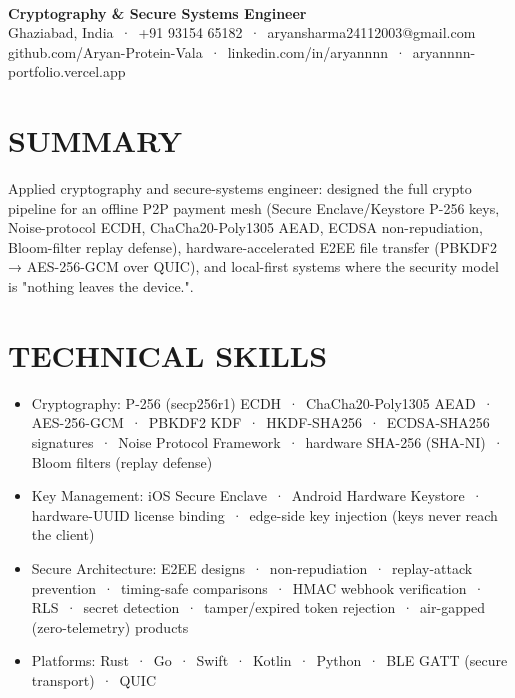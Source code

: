 \documentclass[9pt]{article}
\begin{document}
\\[3pt]
{\large\bfseries Cryptography \& Secure Systems Engineer}\\[3pt]
{\small\color{greyc} Ghaziabad, India \,·\, +91 93154 65182 \,·\, aryansharma24112003@gmail.com}\vspace{-2pt}
{\small\color{greyc} github.com/Aryan-Protein-Vala \,·\, linkedin.com/in/aryannnn \,·\, aryannnn-portfolio.vercel.app}\vspace{-2pt}
\section*{SUMMARY}
Applied cryptography and secure-systems engineer: designed the full crypto pipeline for an offline P2P payment mesh (Secure Enclave/Keystore P-256 keys, Noise-protocol ECDH, ChaCha20-Poly1305 AEAD, ECDSA non-repudiation, Bloom-filter replay defense), hardware-accelerated E2EE file transfer (PBKDF2 → AES-256-GCM over QUIC), and local-first systems where the security model is "nothing leaves the device.".
\vspace{1pt}
\section*{TECHNICAL SKILLS}
\begin{itemize}[leftmargin=11pt,itemsep=0pt,topsep=1pt,parsep=0pt]
\item Cryptography: P-256 (secp256r1) ECDH \,·\, ChaCha20-Poly1305 AEAD \,·\, AES-256-GCM \,·\, PBKDF2 KDF \,·\, HKDF-SHA256 \,·\, ECDSA-SHA256 signatures \,·\, Noise Protocol Framework \,·\, hardware SHA-256 (SHA-NI) \,·\, Bloom filters (replay defense)
\item Key Management: iOS Secure Enclave \,·\, Android Hardware Keystore \,·\, hardware-UUID license binding \,·\, edge-side key injection (keys never reach the client)
\item Secure Architecture: E2EE designs \,·\, non-repudiation \,·\, replay-attack prevention \,·\, timing-safe comparisons \,·\, HMAC webhook verification \,·\, RLS \,·\, secret detection \,·\, tamper/expired token rejection \,·\, air-gapped (zero-telemetry) products
\item Platforms: Rust \,·\, Go \,·\, Swift \,·\, Kotlin \,·\, Python \,·\, BLE GATT (secure transport) \,·\, QUIC
\end{itemize}
\end{document}

